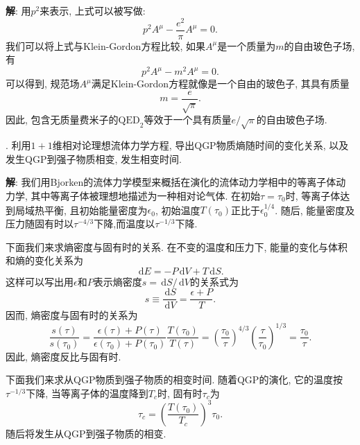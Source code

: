 \documentclass{ctexart}
\newcounter{mycnt}
\newenvironment{problem}{\noindent \stepcounter{mycnt}\themycnt.}{

}
\newenvironment{answer}{\textbf{解}:}{
\vspace{0.5cm}
}
\newcommand\diff{\,\mathrm{d}}
\begin{document}
\begin{answer}
用$p^2$来表示, 上式可以被写做:
\begin{equation}
  p^2 A^\mu - \frac{e^2}{\pi} A^\mu = 0.
\end{equation}
我们可以将上式与Klein-Gordon方程比较, 如果$A^\mu$是一个质量为$m$的自由玻色子场, 有
\begin{equation}
  p^2A^\mu - m^2 A^\mu = 0.
\end{equation}
可以得到, 规范场$A^\mu$满足Klein-Gordon方程就像是一个自由的玻色子, 其具有质量
\begin{equation}
  m = \frac{e}{\sqrt{\pi}}.
\end{equation}
因此, 包含无质量费米子的$\mathrm{QED}_2$等效于一个具有质量$e/\sqrt{\pi}$的自由玻色子场.


\end{answer}

\begin{problem}
  利用$1+1$维相对论理想流体力学方程, 导出QGP物质熵随时间的变化关系, 以及发生QGP到强子物质相变, 发生相变时间.
\end{problem}

\begin{answer}
  我们用Bjorken的流体力学模型来概括在演化的流体动力学相中的等离子体动力学, 其中等离子体被理想地描述为一种相对论气体. 在初始$\tau = \tau_0$时, 等离子体达到局域热平衡, 且初始能量密度为$\epsilon_0$, 初始温度$T(\tau_0)$正比于$\epsilon_0^{1/4}$. 随后, 能量密度及压力随固有时以$\tau^{-4/3}$下降,而温度以$\tau^{-1/3}$下降. 

下面我们来求熵密度与固有时的关系. 在不变的温度和压力下, 能量的变化与体积和熵的变化关系为
\begin{equation}
  \diff E = -P \diff V + T \diff S.
\end{equation}
这样可以写出用$\epsilon$和$P$表示熵密度$s = \diff S / \diff V$的关系式为
\begin{equation}
  s \equiv \frac{\diff S}{\diff V} = \frac{\epsilon + P}{T}.
\end{equation}
因而, 熵密度与固有时的关系为
\begin{equation}
  \frac{s(\tau)}{s(\tau_0)} = \frac{\epsilon(\tau) + P(\tau)}{\epsilon(\tau_0) + P(\tau_0)} \frac{T(\tau_0)}{T(\tau)} = \left( \frac{\tau_0}{\tau} \right)^{4/3} \left( \frac{\tau}{\tau_0} \right)^{1/3} = \frac{\tau_0}{\tau}.
\end{equation}
因此, 熵密度反比与固有时.

下面我们来求从QGP物质到强子物质的相变时间. 随着QGP的演化, 它的温度按$\tau^{-1/3}$下降, 当等离子体的温度降到$T_c$时, 固有时$\tau_c$为
\begin{equation}
  \tau_c = \left( \frac{T(\tau_0)}{T_c} \right)^3 \tau_0.
\end{equation}
随后将发生从QGP到强子物质的相变.

\end{answer}
\end{document}
